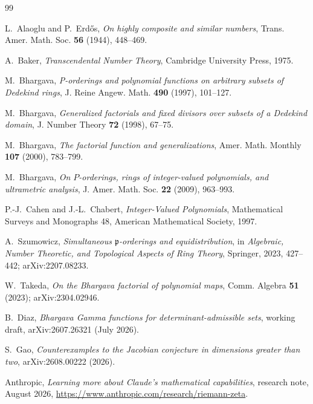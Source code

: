 \documentclass[11pt,oneside]{article}
\theoremstyle{definition}
\theoremstyle{remark}
\begin{document}
\begin{thebibliography}{99}

L.~Alaoglu and P.~Erd\H{o}s,
\newblock \emph{On highly composite and similar numbers},
\newblock Trans. Amer. Math. Soc. \textbf{56} (1944), 448--469.

A.~Baker,
\newblock \emph{Transcendental Number Theory},
\newblock Cambridge University Press, 1975.

M.~Bhargava,
\newblock \emph{
P-orderings and polynomial functions on arbitrary subsets of Dedekind rings},
\newblock J. Reine Angew. Math. \textbf{490} (1997), 101--127.

M.~Bhargava,
\newblock \emph{Generalized factorials and fixed divisors over subsets of a Dedekind domain},
\newblock J. Number Theory \textbf{72} (1998), 67--75.

M.~Bhargava,
\newblock \emph{The factorial function and generalizations},
\newblock Amer. Math. Monthly \textbf{107} (2000), 783--799.

M.~Bhargava,
\newblock \emph{On $P$-orderings, rings of integer-valued polynomials, and ultrametric
analysis},
\newblock J. Amer. Math. Soc. \textbf{22} (2009), 963--993.

P.-J.~Cahen and J.-L.~Chabert,
\newblock \emph{Integer-Valued Polynomials},
\newblock Mathematical Surveys and Monographs 48, American Mathematical Society, 1997.

A.~Szumowicz,
\newblock \emph{Simultaneous $\mathfrak p$-orderings and equidistribution},
\newblock in \emph{Algebraic, Number Theoretic, and Topological Aspects of Ring Theory},
Springer, 2023, 427--442; arXiv:2207.08233.

W.~Takeda,
\newblock \emph{On the Bhargava factorial of polynomial maps},
\newblock Comm. Algebra \textbf{51} (2023); arXiv:2304.02946.

B.~Diaz,
\newblock \emph{Bhargava Gamma functions for determinant-admissible sets},
\newblock working draft, arXiv:2607.26321 (July 2026).

S.~Gao,
\newblock \emph{Counterexamples to the Jacobian conjecture in dimensions greater than two},
\newblock arXiv:2608.00222 (2026).

Anthropic,
\newblock \emph{Learning more about Claude's mathematical capabilities},
\newblock research note, August 2026,
\newblock \url{https://www.anthropic.com/research/riemann-zeta}.


\end{thebibliography}
\end{document}

